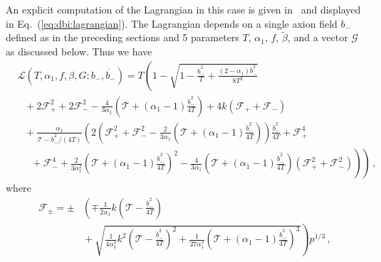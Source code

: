 \documentclass[12pt]{article}
\begin{document}
An explicit computation of the Lagrangian in this case is given in~\cite{Nath:2018xxe} and displayed in Eq.~(\ref{eq:dbi:lagrangian}).
The Lagrangian depends on a single axion field $b_-$ defined as in the preceding sections and 5 parameters $T$, $\alpha_1$, $f$, $\tilde\beta$, and a vector $\mathcal{G}$ as discussed below.
Thus we have
\begin{equation} \label{eq:dbi:lagrangian}
  \begin{aligned}
    &\mathcal{L}\left(T, \alpha_1, f, \beta, G; b_-, \dot{b_-}\right) = T \left(
        1
      - \sqrt{
          1
        - \frac{{\dot b}_-^2}{T}
        + \frac{\left(2 - \alpha_1\right) {\dot b}_-^2}{8 T^2}
      }\right.\\
      &~~~ \left.{}
      + 2 \mathcal{F}_+^2
      + 2 \mathcal{F}_-^2
      - \frac{4}{3 \alpha_1} \left(
        \mathcal{T} + \left(\alpha_1 - 1\right) \frac{{\dot b}_-^2}{4 T}
      \right)
      + 4 k \left(\mathcal{F}_+ + \mathcal{F}_-\right)\right.\\
      &~~~ \left.{}
      + \frac{\alpha_1}{\mathcal{T} - {\dot b}_-^2 / \left(4 T\right)}\left(
          2 \left(
              \mathcal{F}_+^2
            + \mathcal{F}_-^2
            - \frac{2}{3 \alpha_1}
              \left(\mathcal{T} + \left(\alpha_1 - 1\right) \frac{{\dot b}_-^2}{4 T}\right)
          \right) \frac{{\dot b}_-^2}{4 T}
        + \mathcal{F}_+^4\right.\right.\\
        &~~~~~~ \left.\left.{}
        + \mathcal{F}_-^4
        + \frac{2}{3 \alpha_1^2}
          \left(\mathcal{T} + \left(\alpha_1 - 1\right) \frac{{\dot b}_-^2}{4 T}\right)^2
        - \frac{4}{3 \alpha_1}
          \left(\mathcal{T} + \left(\alpha_1 - 1\right) \frac{{\dot b}_-^2}{4 T}\right)
          \left(\mathcal{F}_+^2 + \mathcal{F}_-^2\right)
      \right)
    \right)\,,
  \end{aligned}
\end{equation}
where
\begin{equation}
  \begin{aligned}
    \mathcal{F}_\pm = \pm &\left(
      \mp\frac{1}{2 \alpha_1} k \left(\mathcal{T} - \frac{{\dot b}_-^2}{4 T}\right)\right.\\
      &\left.{} + \sqrt{
          \frac{1}{4 \alpha_1^2} k^2 \left(\mathcal{T} - \frac{{\dot b}_-^2}{4 T}\right)^2
        + \frac{1}{27 \alpha_1^3} \left(
            \mathcal{T}
          + \left(\alpha_1 - 1\right) \frac{{\dot b}_-^2}{4 T}
        \right)^3
      }
    \right) \mathit{p}^{1 / 3}\,,
  \end{aligned}
\end{equation}
\end{document}

